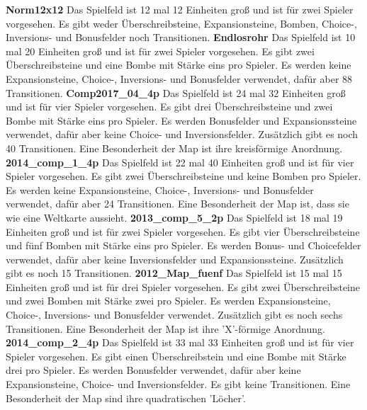 \documentclass[12pt,a4paper,bibliography=totocnumbered,listof=totocnumbered]{scrartcl}
\begin{document}
	\textbf{Norm12x12}\newline
	Das Spielfeld ist 12 mal 12 Einheiten groß und ist für zwei Spieler vorgesehen. Es gibt weder Überschreibsteine, Expansionsteine, Bomben, Choice-, Inversions- und Bonusfelder noch Transitionen.\newline
	\textbf{Endlosrohr}\newline
	Das Spielfeld ist 10 mal 20 Einheiten groß und ist für zwei Spieler vorgesehen. Es gibt zwei Überschreibsteine und eine Bombe mit Stärke eins pro Spieler. Es werden keine Expansionsteine, Choice-, Inversions- und Bonusfelder verwendet, dafür aber 88 Transitionen.\newline
	\textbf{Comp2017\_04\_4p}\newline
	Das Spielfeld ist 24 mal 32 Einheiten groß und ist für vier Spieler vorgesehen. Es gibt drei Überschreibsteine und zwei Bombe mit Stärke eins pro Spieler. Es werden Bonusfelder und Expansionssteine verwendet, dafür aber keine Choice- und Inversionsfelder. Zusätzlich gibt es noch 40 Transitionen. Eine Besonderheit der Map ist ihre kreisförmige Anordnung.\newline
	\textbf{2014\_comp\_1\_4p}\newline
	Das Spielfeld ist 22 mal 40 Einheiten groß und ist für vier Spieler vorgesehen. Es gibt zwei Überschreibsteine und keine Bomben pro Spieler. Es werden keine Expansionsteine, Choice-, Inversions- und Bonusfelder verwendet, dafür aber 24 Transitionen. Eine Besonderheit der Map ist, dass sie wie eine Weltkarte aussieht.\newline
	\textbf{2013\_comp\_5\_2p}\newline
	Das Spielfeld ist 18 mal 19 Einheiten groß und ist für zwei Spieler vorgesehen. Es gibt vier Überschreibsteine und fünf Bomben mit Stärke eins pro Spieler. Es werden Bonus- und Choicefelder verwendet, dafür aber keine Inversionsfelder und Expansionssteine. Zusätzlich gibt es noch 15 Transitionen.\newline
	\textbf{2012\_Map\_fuenf}\newline
	Das Spielfeld ist 15 mal 15 Einheiten groß und ist für drei Spieler vorgesehen. Es gibt zwei Überschreibsteine und zwei Bomben mit Stärke zwei pro Spieler. Es werden Expansionsteine, Choice-, Inversions- und Bonusfelder verwendet. Zusätzlich gibt es noch sechs Transitionen. Eine Besonderheit der Map ist ihre 'X'-förmige Anordnung.\newline
	\textbf{2014\_comp\_2\_4p}\newline
	Das Spielfeld ist 33 mal 33 Einheiten groß und ist für vier Spieler vorgesehen. Es gibt einen Überschreibstein und eine Bombe mit Stärke drei pro Spieler. Es werden Bonusfelder verwendet, dafür aber keine Expansionsteine, Choice- und Inversionsfelder. Es gibt keine Transitionen. Eine Besonderheit der Map sind ihre quadratischen 'Löcher'.\newline
\end{document}
